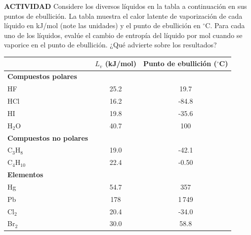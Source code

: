\item \textbf{ACTIVIDAD} Considere los diversos líquidos en la tabla a continuación en sus puntos de ebullición. La tabla muestra el calor latente de vaporización de cada líquido en kJ/mol (note las unidades) y el punto de ebullición en $^\circ\text{C}$. Para cada uno de los líquidos, evalúe el cambio de entropía del líquido por mol cuando se vaporice en el punto de ebullición. ¿Qué advierte sobre los resultados?

\begin{center}
\begin{tabular}{lcc}
\hline
& \textbf{$L_v$ (kJ/mol)} & \textbf{Punto de ebullición ($^\circ$C)} \\
\hline
\textbf{Compuestos polares} & & \\
HF & 25.2 & 19.7 \\
HCl & 16.2 & -84.8 \\
HI & 19.8 & -35.6 \\
H$_2$O & 40.7 & 100 \\
\textbf{Compuestos no polares} & & \\
C$_3$H$_8$ & 19.0 & -42.1 \\
C$_4$H$_{10}$ & 22.4 & -0.50 \\
\textbf{Elementos} & & \\
Hg & 54.7 & 357 \\
Pb & 178 & 1\,749 \\
Cl$_2$ & 20.4 & -34.0 \\
Br$_2$ & 30.0 & 58.8 \\
\hline
\end{tabular}
\end{center}
